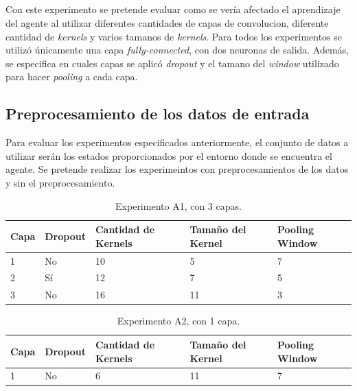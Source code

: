 \documentclass[journal]{IEEEtran}
\begin{document}
\subsection{}
Con este experimento se pretende evaluar como se vería afectado el aprendizaje del agente al utilizar diferentes cantidades de capas de convolucion, diferente cantidad de \emph{kernels} y varios tamanos de \emph{kernels}. Para todos los experimentos se utilizó únicamente una capa \emph{fully-connected}, con dos neuronas de salida. Además, se especifica en cuales capas se aplicó \emph{dropout} y el tamano del \emph{window} utilizado para hacer \emph{pooling} a cada capa.

\subsection{Preprocesamiento de los datos de entrada}
    Para evaluar los experimentos especificados anteriormente, el conjunto de datos a utilizar serán los estados proporcionados por el entorno donde se encuentra el agente. Se pretende realizar los experimeintos con preprocesamientos de los datos y sin el preprocesamiento.
    
    \begin{table}[h!]
        \centering
        
        \begin{tabular}{@{}lllll@{}}
            \toprule
            Capa & Dropout & Cantidad de Kernels & Tamaño del Kernel & Pooling Window \\ \midrule
            1    & No      & 10                  & 5                 & 7              \\
            2    & Sí      & 12                  & 7                 & 5              \\
            3    & No      & 16                  & 11                & 3              \\ \bottomrule
        \end{tabular}
        \caption{Experimento A1, con 3 capas.\label{tab:A1}}
        \end{table}
    
        \begin{table}[h!]
            \centering
            \begin{tabular}{@{}lllll@{}}
                \toprule
                Capa & Dropout & Cantidad de Kernels & Tamaño del Kernel & Pooling Window \\ \midrule
                1    & No      & 6                   & 11                & 7             
            \end{tabular}
            \caption{Experimento A2, con 1 capa.\label{tab:A2}}
            \end{table}
    
\end{document}
